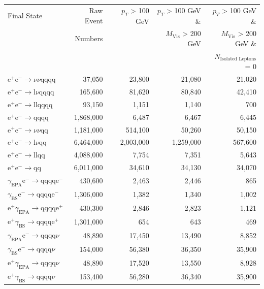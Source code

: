 \begin{table}[h!]
\centering
\begin{tabular}{ l r r r r }
\hline
Final State & Raw Event  & $p_{T}$ > 100 GeV & $p_{T}$ > 100 GeV \& & $p_{T}$ > 100 GeV \& \\ 
& Numbers & & $M_{\text{Vis}}$ > 200 GeV & $M_{\text{Vis}}$ > 200 GeV \&\\ 
& & & & $N_{\text{Isolated Leptons}}$ = 0\\ 
\hline
$\text{e}^{+}\text{e}^{-} \rightarrow \nu{\nu}\text{qqqq}$ & 37,050 & 23,800 & 21,080 & 21,020\\
$\text{e}^{+}\text{e}^{-} \rightarrow \text{l}\nu\text{qqqq}$ & 165,600 & 81,620 & 80,840 & 42,410\\
$\text{e}^{+}\text{e}^{-} \rightarrow \text{llqqqq}$ & 93,150 & 1,151 & 1,140 & 700\\
$\text{e}^{+}\text{e}^{-} \rightarrow \text{qqqq}$ & 1,868,000 & 6,487 & 6,467 & 6,445\\
$\text{e}^{+}\text{e}^{-} \rightarrow \nu{\nu}\text{qq}$ & 1,181,000 & 514,100 & 50,260 & 50,150\\
$\text{e}^{+}\text{e}^{-} \rightarrow \text{l}\nu\text{qq}$ & 6,464,000 & 2,003,000 & 1,259,000 & 567,600\\
$\text{e}^{+}\text{e}^{-} \rightarrow \text{llqq}$ & 4,088,000 & 7,754 & 7,351 & 5,643\\
$\text{e}^{+}\text{e}^{-} \rightarrow \text{qq}$ & 6,011,000 & 34,610 & 34,130 & 34,070\\
$\gamma_{\text{EPA}}\text{e}^{-} \rightarrow \text{qqqq}\text{e}^{-}$ & 430,600 & 2,463 & 2,446 & 865\\
$\gamma_{\text{BS}}\text{e}^{-} \rightarrow \text{qqqq}\text{e}^{-}$ & 1,306,000 & 1,382 & 1,340 & 1,002\\
$\text{e}^{+}\gamma_{\text{EPA}} \rightarrow \text{qqqq}\text{e}^{+}$ & 430,300 & 2,846 & 2,823 & 1,121\\
$\text{e}^{+}\gamma_{\text{BS}} \rightarrow \text{qqqq}\text{e}^{+}$ & 1,301,000 & 654 & 643 & 469\\
$\gamma_{\text{EPA}}\text{e}^{-} \rightarrow \text{qqqq}\nu$ & 48,890 & 17,450 & 13,490 & 8,852\\
$\gamma_{\text{BS}}\text{e}^{-} \rightarrow \text{qqqq}\nu$ & 154,000 & 56,380 & 36,350 & 35,900\\
$\text{e}^{+}\gamma_{\text{EPA}} \rightarrow \text{qqqq}\nu$ & 48,890 & 17,520 & 13,550 & 8,928\\
$\text{e}^{+}\gamma_{\text{BS}} \rightarrow \text{qqqq}\nu$ & 153,400 & 56,280 & 36,340 & 35,900\\

\end{tabular}
\end{table}

